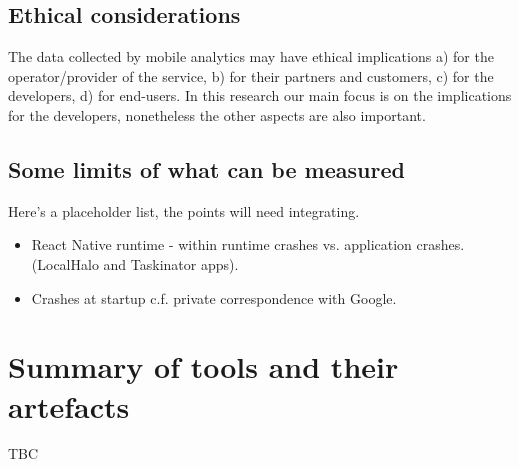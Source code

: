 \subsection{Ethical considerations}
The data collected by mobile analytics may have ethical implications a) for the operator/provider of the service, b) for their partners and customers, c) for the developers, d) for end-users. In this research our main focus is on the implications for the developers, nonetheless the other aspects are also important.


\subsection{Some limits of what can be measured}

Here's a placeholder list, the points will need integrating.
\begin{itemize}
    \item React Native runtime - within runtime crashes vs. application crashes. (LocalHalo and Taskinator apps).
    \item Crashes at startup c.f. private correspondence with Google.
\end{itemize}


\section{Summary of tools and their artefacts}
TBC